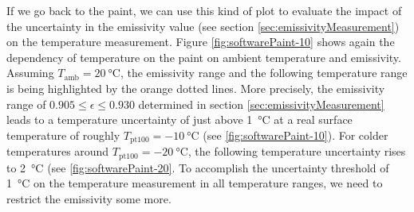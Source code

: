 If we go back to the paint, we can use this kind of plot to evaluate the impact of the uncertainty in the emissivity value (see section \ref{sec:emissivityMeasurement}) on the temperature measurement. Figure \ref{fig:softwarePaint-10} shows again the dependency of temperature on the paint on ambient temperature and emissivity. Assuming $T_\text{amb}=\SI{20}{\degreeCelsius}$, the emissivity range and the following temperature range is being highlighted by the orange dotted lines. More precisely, the emissivity range of $0.905\leq\epsilon\leq0.930$ determined in section \ref{sec:emissivityMeasurement} leads to a temperature uncertainty of just above \SI{1}{\degreeCelsius} at a real surface temperature of roughly $T_\text{pt100} = \SI{-10}{\degreeCelsius}$ (see \ref{fig:softwarePaint-10}). For colder temperatures around $T_\text{pt100} = \SI{-20}{\degreeCelsius}$, the following temperature uncertainty rises to \SI{2}{\degreeCelsius} (see \ref{fig:softwarePaint-20}. To accomplish the uncertainty threshold of \SI{1}{\degreeCelsius} on the temperature measurement in all temperature ranges, we need to restrict the emissivity some more.
